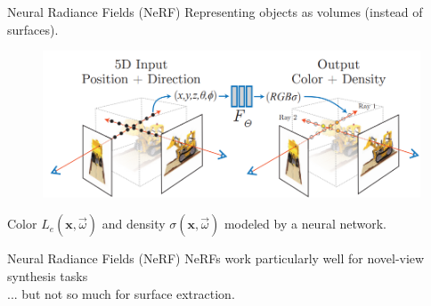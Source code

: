 \documentclass[10pt]{beamer}
\newcommand{\bx}{\mathbf{x}}
\begin{document}
{
\begin{frame}{Neural Radiance Fields (NeRF)}
    Representing objects as volumes (instead of surfaces).
    \begin{figure}
        \centering
        \includegraphics[width=0.9\linewidth]{figures/vol/nerf.png}
    \end{figure}

    Color \(L_e(\bx, \vec{\omega})\) and density \(\sigma(\bx, \vec{\omega})\) modeled by a \alert{neural network}.
\end{frame}

\begin{frame}{Neural Radiance Fields (NeRF)}
    NeRFs work particularly well for \alert{novel-view synthesis} tasks \\

    ... but not so much for \alert{surface extraction}.


\end{frame}}
\end{document}
